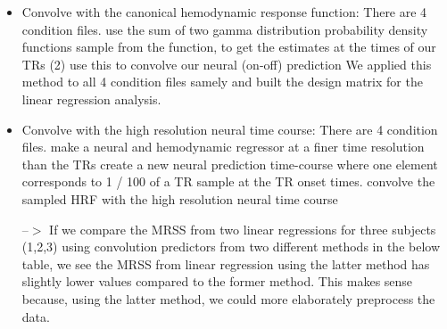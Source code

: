 \begin{itemize}
\item Convolve with the canonical hemodynamic response function:\newline
\indent There are 4 condition files.\newline
\indent use the sum of two gamma distribution probability density functions\newline
\indent sample from the function, to get the estimates at the times of our TRs (2)\newline
\indent use this to convolve our neural (on-off) prediction\newline
\indent We applied this method to all 4 condition files samely and built the design matrix for the linear regression analysis. \newline


\item Convolve with the high resolution neural time course:\newline
\indent There are 4 condition files.\newline
\indent make a neural and hemodynamic regressor at a finer time resolution than the TRs\newline
\indent create a new neural prediction time-course where one element corresponds to 1 / 100 of a TR\newline
\indent sample at the TR onset times.
\indent convolve the sampled HRF with the high resolution neural time course\newline



--$>$ If we compare the MRSS from two linear regressions for three subjects (1,2,3) using convolution predictors from two different methods in the below table, we see the MRSS from linear regression using the latter method has slightly lower values compared to the former method. This makes sense because, using the latter method, we could more elaborately preprocess the data.
\end {itemize}
